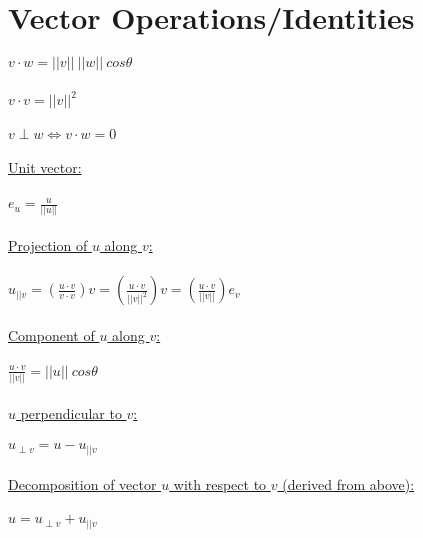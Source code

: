 \documentclass[12pt]{article}
\begin{document}
\maketitle

\section*{Vector Operations/Identities}
\noindent
$
v \cdot w = ||v|| \ ||w|| \ cos\theta
$\\\\
$
v \cdot v = ||v||^2
$\\\\
\noindent
$
v \perp w \Leftrightarrow v \cdot w = 0
$\\\\
\underline{Unit vector:}\\\\
$
e_u = \frac{u}{||u||}
$\\\\
\underline{Projection of $u$ along $v$:}\\\\
$
u_{||v} = \left(\frac{u\cdot v}{v \cdot v}\right) v = \left(\frac{u\cdot v}{||v||^2}\right)v = \left(\frac{u\cdot v}{||v||}\right)e_v
$\\\\
\underline{Component of $u$ along $v$:}\\\\
$
\frac{u \cdot v}{||v||} = ||u|| \ cos\theta
$\\\\	
\noindent
\underline{$u$ perpendicular to $v$:}\\\\
$
u_{\perp v} = u - u_{||v}
$\\\\
\underline{Decomposition of vector $u$ with respect to $v$ (derived from above):}\\\\
$
u = u_{\perp v} + u_{||v}
$\\\\
\clearpage
\end{document}
